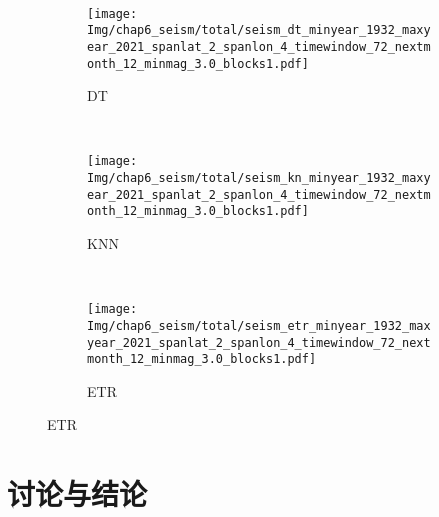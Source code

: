 \begin{figure}[!htbp]
\begin{subfigure}[b]{0.45\textwidth}
    \vspace{-1cm}
    \label{fig:seism_gbr_minyear_1932_maxyear_2021_spanlat_2_spanlon_4_timewindow_72_nextmonth_12_minmag_3.0_blocks1}
  \end{subfigure}
  ~
  \begin{subfigure}[b]{0.45\textwidth}
    \caption{DT}
    \vspace{-0.2cm}
    \texttt{[image: Img/chap6\_seism/total/seism\_dt\_minyear\_1932\_maxyear\_2021\_spanlat\_2\_spanlon\_4\_timewindow\_72\_nextmonth\_12\_minmag\_3.0\_blocks1.pdf]}
    \vspace{-1cm}
    \label{fig:seism_dt_minyear_1932_maxyear_2021_spanlat_2_spanlon_4_timewindow_72_nextmonth_12_minmag_3.0_blocks1}
  \end{subfigure}
  \\
  \begin{subfigure}[b]{0.45\textwidth}
    \caption{KNN}
    \vspace{-0.2cm}
    \texttt{[image: Img/chap6\_seism/total/seism\_kn\_minyear\_1932\_maxyear\_2021\_spanlat\_2\_spanlon\_4\_timewindow\_72\_nextmonth\_12\_minmag\_3.0\_blocks1.pdf]}
    \vspace{-1cm}
    \label{fig:seism_knn_minyear_1932_maxyear_2021_spanlat_2_spanlon_4_timewindow_72_nextmonth_12_minmag_3.0_blocks1}
  \end{subfigure}
  ~
  \begin{subfigure}[b]{0.45\textwidth}
    \caption{ETR}
    \vspace{-0.2cm}
    \texttt{[image: Img/chap6\_seism/total/seism\_etr\_minyear\_1932\_maxyear\_2021\_spanlat\_2\_spanlon\_4\_timewindow\_72\_nextmonth\_12\_minmag\_3.0\_blocks1.pdf]}
    \vspace{-1cm}
    \label{fig:seism_etr_minyear_1932_maxyear_2021_spanlat_2_spanlon_4_timewindow_72_nextmonth_12_minmag_3.0_blocks1}
  \end{subfigure}
  \label{fig:seism_minyear_1932_maxyear_2021_spanlat_2_spanlon_4_timewindow_72_nextmonth_12_minmag_3.0_blocks1}
\end{figure}




\section{讨论与结论}\label{sec:seism_conclusion}

